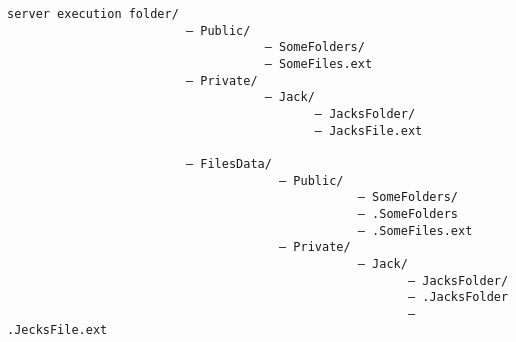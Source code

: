 \begin{verbatim}
server execution folder/
                         — Public/
                                    — SomeFolders/
                                    — SomeFiles.ext
                         — Private/
                                    — Jack/
                                           — JacksFolder/
                                           — JacksFile.ext

                         — FilesData/
                                      — Public/
                                                 — SomeFolders/
                                                 – .SomeFolders
                                                 — .SomeFiles.ext
                                      — Private/
                                                 — Jack/
                                                        — JacksFolder/
                                                        — .JacksFolder
                                                        — .JecksFile.ext
\end{verbatim}
